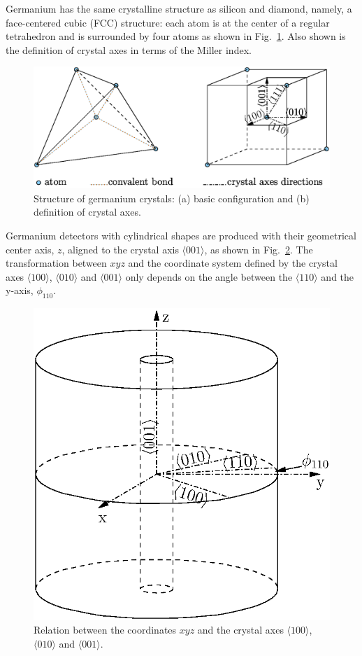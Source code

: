 \documentclass[epj]{svjour}
\begin{document}
Germanium has the same crystalline structure as silicon and diamond,
namely, a face-centered cubic (FCC) structure: each atom is at the
center of a regular tetrahedron and is surrounded by four atoms as
shown in Fig.~\ref{f:xtal}. Also shown is the definition of crystal
axes in terms of the Miller index.
\begin{figure}[htpb]
\centering
\includegraphics[width=\linewidth]{xtalStruc}   
\caption{Structure of germanium crystals: (a) basic configuration and
(b) definition of crystal axes.}
\label{f:xtal} 
\end{figure} 

Germanium detectors with cylindrical shapes are produced with their
geometrical center axis, $z$, aligned to the crystal axis $\langle 001
\rangle$, as shown in Fig.~\ref{f:coo}. The transformation between
$xyz$ and the coordinate system defined by the crystal axes $\langle
100 \rangle$, $\langle 010 \rangle$ and $\langle 001 \rangle$ only
depends on the angle between the $\langle 110 \rangle$ and the y-axis,
$\phi_{110}$.
\begin{figure}[htpb]\sidecaption
\includegraphics[width=0.55\linewidth]{coordins}
\caption{Relation between the coordinates $xyz$ and the crystal
axes $\langle 100 \rangle$, $\langle 010 \rangle$ and $\langle 001
\rangle$.}
\label{f:coo} 
\end{figure} 
 
\end{document}
